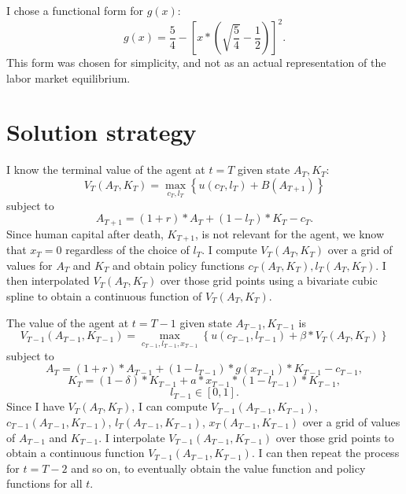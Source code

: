 \documentclass[12pt]{article}
\begin{document}
I chose a functional form for $g(x)$:
\begin{equation}
    g(x) = \frac{5}{4} - \left[ x* \left( \sqrt{\frac{5}{4}} - \frac{1}{2} \right) \right]^2.
\end{equation}
This form was chosen for simplicity, and not as an actual representation of the labor market equilibrium.

\section{Solution strategy}
I know the terminal value of the agent at $t = T$ given state $A_T, K_T$:
\begin{equation}
    V_T(A_T, K_T) = \max_{c_T, l_T} \left\{ u(c_T, l_T) + B(A_{T+1}) \right\}
\end{equation}
subject to
\begin{equation}
    A_{T+1} = (1+r)*A_{T} + (1-l_{T})*K_{T} - c_{T}.
\end{equation}
Since human capital after death, $K_{T+1}$, is not relevant for the agent, we know that $x_T = 0$ regardless of the choice of $l_T$.
I compute $V_T(A_T, K_T)$ over a grid of values for $A_T$ and $K_T$ and obtain policy functions $c_T(A_T, K_T), l_T(A_T, K_T)$.
I then interpolated $V_T(A_T, K_T)$ over those grid points using a bivariate cubic spline to obtain a continuous function of $V_T(A_T, K_T)$.

The value of the agent at $t = T-1$ given state $A_{T-1}, K_{T-1}$ is
\begin{equation}
    V_{T-1}(A_{T-1}, K_{T-1}) = \max_{c_{T-1}, l_{T-1}, x_{T-1}} \left\{ u(c_{T-1}, l_{T-1}) + \beta*V_{T}(A_{T}, K_{T}) \right\}
\end{equation}
subject to
\begin{equation}
    A_{T} = (1+r)*A_{T-1} + (1-l_{T-1})*g(x_{T-1})*K_{T-1} - c_{T-1},
\end{equation}
\begin{equation}
    K_{T} = (1-\delta)*K_{T-1} + a*x_{T-1}*(1-l_{T-1})*K_{T-1},
\end{equation}
\begin{equation}
    l_{T-1} \in [0,1].
\end{equation}
Since I have $V_T(A_T, K_T)$, I can compute $V_{T-1}(A_{T-1}, K_{T-1})$, $c_{T-1}(A_{T-1}, K_{T-1})$, $l_T(A_{T-1}, K_{T-1})$, $x_T(A_{T-1}, K_{T-1})$ over a grid of values of $A_{T-1}$ and $K_{T-1}$.
I interpolate $V_{T-1}(A_{T-1}, K_{T-1})$ over those grid points to obtain a continuous function $V_{T-1}(A_{T-1}, K_{T-1})$.
I can then repeat the process for $t = T-2$ and so on, to eventually obtain the value function and policy functions for all $t$.

\printbibliography
\end{document}
